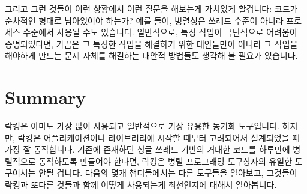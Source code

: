 그리고 그런 것들이 이런 상황에서 이런 질문을 해보는게 가치있게 할겁니다:
코드가 순차적인 형태로 남아있어야 하는가?
예를 들어, 병렬성은 쓰레드 수준이 아니라 프로세스 수준에서 사용될 수도
있습니다.
일반적으로, 특정 작업이 극단적으로 어려움이 증명되었다면, 가끔은 그 특정한
작업을 해결하기 위한 대안들만이 아니라 그 작업을 해야하게 만드는 문제 자체를
해결하는 대안적 방법들도 생각해 볼 필요가 있습니다.

\section{Summary}
\label{sec:locking:Summary}

락킹은 아마도 가장 많이 사용되고 일반적으로 가장 유용한 동기화 도구입니다.
하지만, 락킹은 어플리케이션이나 라이브러리에 시작할 때부터 고려되어서
설계되었을 때 가장 잘 동작합니다.
기존에 존재하던 싱글 쓰레드 기반의 거대한 코드를 하루만에 병렬적으로 동작하도록
만들어야 한다면, 락킹은 병렬 프로그래밍 도구상자의 유일한 도구여서는 안될
겁니다.
다음의 몇개 챕터들에서는 다른 도구들을 알아보고, 그것들이 락킹과 또다른 것들과
함께 어떻게 사용되는게 최선인지에 대해서 알아봅니다.

